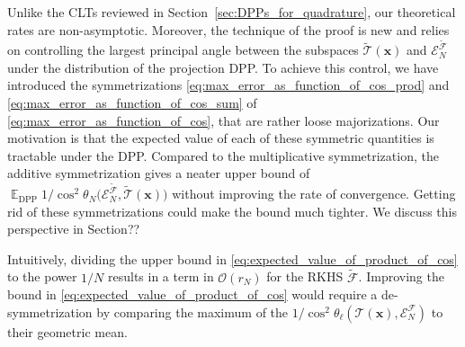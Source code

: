 \documentclass[twoside,11pt]{book}
\numberwithin{theorem}{chapter}
\numberwithin{definition}{chapter}
\numberwithin{proposition}{chapter}
\numberwithin{corollary}{chapter}
\numberwithin{example}{chapter}
\numberwithin{lemma}{chapter}
\numberwithin{assumption}{chapter}
\numberwithin{equation}{chapter}
\numberwithin{figure}{chapter}
\DeclareMathOperator{\DPP}{\mathrm{DPP}}
\DeclareMathOperator{\EX}{\mathbb{E}}
\DeclareMathOperator{\F}{\mathcal{F}}
\begin{document}
Unlike the CLTs reviewed in Section~\ref{sec:DPPs_for_quadrature}, our theoretical rates are non-asymptotic. Moreover, the technique of the proof is new and relies on controlling the  largest principal angle between the subspaces $\tilde{\mathcal{T}}(\bm{x})$ and $\mathcal{E}_{N}^{\tilde{\F}}$ under the distribution of the projection DPP. To achieve this control, we have introduced the symmetrizations \eqref{eq:max_error_as_function_of_cos_prod} and \eqref{eq:max_error_as_function_of_cos_sum}  of \eqref{eq:max_error_as_function_of_cos}, that are rather loose majorizations. Our motivation is that the expected value of each of these symmetric quantities is tractable under the DPP. 
Compared to the multiplicative symmetrization, the additive symmetrization gives a neater upper bound of $\EX_{\DPP}  1 \big/\cos^{2} \theta_{N} \big(\mathcal{E}^{\tilde{\mathcal{F}}}_{N}, \tilde{\mathcal{T}}(\bm{x}) \big)$ without improving the rate of convergence. Getting rid of these symmetrizations could make the bound much tighter. We discuss this perspective in Section??


Intuitively, dividing  the upper bound in \eqref{eq:expected_value_of_product_of_cos} to the power $1/N$ results in a term in $\mathcal{O}(r_{N})$ for the RKHS $\tilde{\mathcal{F}}$. Improving the bound in \eqref{eq:expected_value_of_product_of_cos} would require a de-symmetrization by comparing the maximum of the $1/\cos^{2} \theta_{\ell}(\mathcal{T}(\bm{x}),\mathcal{E}^{\mathcal{F}}_{N})$ to their geometric mean.





\end{document}
